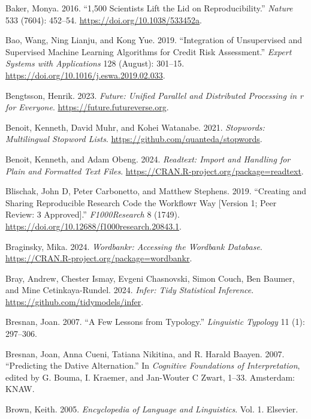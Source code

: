 \documentclass[
  letterpaper,
]{latex/krantz}
\newlength{\cslhangindent}
\newenvironment{CSLReferences}[2] %
 {\begin{list}{}{%
  \setlength{\itemindent}{0pt}
  \setlength{\leftmargin}{0pt}
  \setlength{\parsep}{0pt}
  \ifodd #1
   \setlength{\leftmargin}{\cslhangindent}
   \setlength{\itemindent}{-1\cslhangindent}
  \fi
  \setlength{\itemsep}{#2\baselineskip}}}
 {\end{list}}
\theoremstyle{definition}
\theoremstyle{remark}
\begin{document}
\begin{CSLReferences}{1}{0}
Baker, Monya. 2016. {``1,500 Scientists Lift the Lid on
Reproducibility.''} \emph{Nature} 533 (7604): 452--54.
\url{https://doi.org/10.1038/533452a}.

Bao, Wang, Ning Lianju, and Kong Yue. 2019. {``Integration of
Unsupervised and Supervised Machine Learning Algorithms for Credit Risk
Assessment.''} \emph{Expert Systems with Applications} 128 (August):
301--15. \url{https://doi.org/10.1016/j.eswa.2019.02.033}.

Bengtsson, Henrik. 2023. \emph{Future: Unified Parallel and Distributed
Processing in r for Everyone}. \url{https://future.futureverse.org}.

Benoit, Kenneth, David Muhr, and Kohei Watanabe. 2021. \emph{Stopwords:
Multilingual Stopword Lists}.
\url{https://github.com/quanteda/stopwords}.

Benoit, Kenneth, and Adam Obeng. 2024. \emph{Readtext: Import and
Handling for Plain and Formatted Text Files}.
\url{https://CRAN.R-project.org/package=readtext}.

Blischak, John D, Peter Carbonetto, and Matthew Stephens. 2019.
{``Creating and Sharing Reproducible Research Code the Workflowr Way
{[}Version 1; Peer Review: 3 Approved{]}.''} \emph{F1000Research} 8
(1749). \url{https://doi.org/10.12688/f1000research.20843.1}.

Braginsky, Mika. 2024. \emph{Wordbankr: Accessing the Wordbank
Database}. \url{https://CRAN.R-project.org/package=wordbankr}.

Bray, Andrew, Chester Ismay, Evgeni Chasnovski, Simon Couch, Ben Baumer,
and Mine Cetinkaya-Rundel. 2024. \emph{Infer: Tidy Statistical
Inference}. \url{https://github.com/tidymodels/infer}.

Bresnan, Joan. 2007. {``A Few Lessons from Typology.''} \emph{Linguistic
Typology} 11 (1): 297--306.

Bresnan, Joan, Anna Cueni, Tatiana Nikitina, and R. Harald Baayen. 2007.
{``Predicting the Dative Alternation.''} In \emph{Cognitive Foundations
of Interpretation}, edited by G. Bouma, I. Kraemer, and Jan-Wouter C
Zwart, 1--33. Amsterdam: KNAW.

Brown, Keith. 2005. \emph{Encyclopedia of Language and Linguistics}.
Vol. 1. Elsevier.


\end{CSLReferences}
\end{document}
